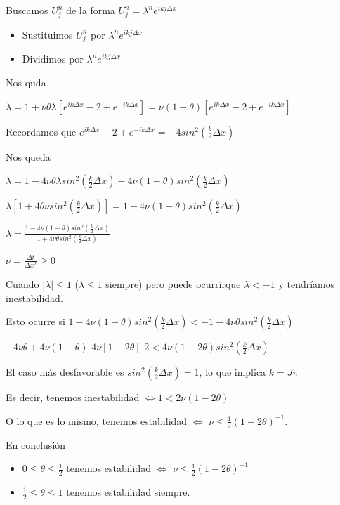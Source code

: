 Buscamos $U_{j}^{n}$ de la forma
$U_{j}^{n} = \lambda ^n e^{ikj\Delta x}$

\begin{itemize}
	\item Sustituimos $U_{j}^{n}$ por $\lambda^n e^{ikj\Delta x}$
	\item Dividimos por $\lambda^n e^{ikj\Delta x}$
\end{itemize}

Nos quda

$\lambda = 1+ \nu\theta\lambda\left[e^{ik\Delta x}-2+e^{-ik\Delta x}\right] = \nu(1-\theta)\left[e^{ik\Delta x} - 2 + e^{-ik\Delta x}\right]$

Recordamos que
$e^{ik\Delta x}-2+e^{-ik\Delta x} = -4sin^2(\frac{k}{2}\Delta x)$ 

Nos queda

$\lambda = 1-4\nu\theta\lambda sin^2(\frac{k}{2}\Delta x)-4\nu(1-\theta)sin^2(\frac{k}{2}\Delta x)$

$\lambda\left[1+4\theta\nu sin^2(\frac{k}{2}\Delta x) \right] = 1 - 4\nu(1-\theta)sin^2(\frac{k}{2}\Delta x)$

$\lambda = \frac{1-4\nu(1-\theta)sin^2(\frac{k}{2}\Delta x)}{1+4\nu\theta sin^2(\frac{k}{2}\Delta x)}$

$\nu = \frac{\Delta t}{\Delta x ^ 2} \ge 0$

Cuando $|\lambda|\le 1$ ($\lambda \le 1$ siempre) pero puede ocurrirque $\lambda < -1$ y tendríamos inestabilidad.

Esto ocurre si $1-4\nu(1-\theta)sin^2(\frac{k}{2}\Delta x) < -1-4\nu\theta sin^2(\frac{k}{2}\Delta x)$

$-4\nu\theta +4\nu(1-\theta)$
$4\nu\left[1 -2\theta\right]$
$2 < 4\nu(1-2\theta)sin^2(\frac{k}{2}\Delta x)$


El caso más desfavorable es $sin^2(\frac{k}{2}\Delta x) = 1$, lo que implica $k=J\pi$

Es decir, tenemos inestabilidad $\iff 1 < 2\nu(1-2\theta)$

O lo que es lo mismo, tenemos estabilidad $\iff$ $\nu\le \frac{1}{2}(1-2\theta)^{-1}$.

En conclusión
\begin{itemize}
	\item $0\le\theta\le\frac{1}{2}$
	tenemos estabilidad $\iff$ $\nu\le\frac{1}{2}(1-2\theta)^{-1}$
	\item $\frac{1}{2}\le \theta \le 1$ 
	tenemos estabilidad siempre.
\end{itemize}

